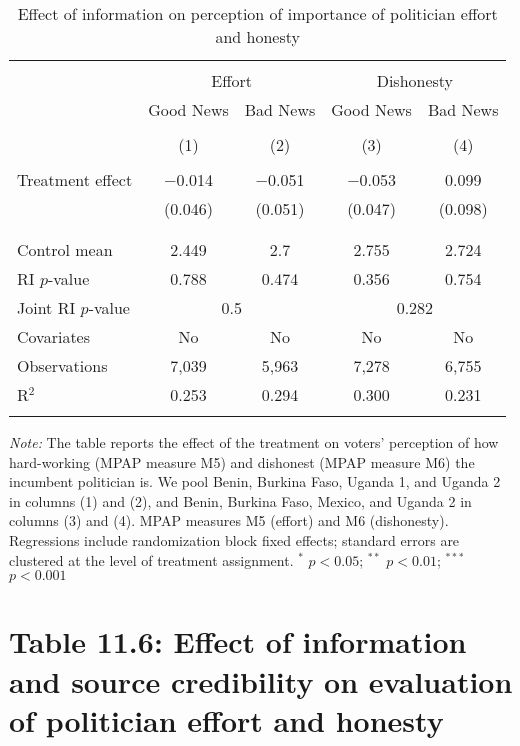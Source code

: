 \documentclass[]{article}
\begin{document}
\begin{table}[!htbp] \centering 
  \caption{Effect of information on perception of importance of politician effort and honesty} 
  \label{effort_honesty} 
\begin{tabular}{@{\extracolsep{1pt}}lcccc} 
\\[-1.8ex]\hline 
\hline \\[-1.8ex] 
 & \multicolumn{2}{c}{Effort}&\multicolumn{2}{c}{Dishonesty} \\ 
\cline{2-5} 
 & Good News & Bad News & Good News & Bad News \\ 
\\[-1.8ex] & (1) & (2) & (3) & (4)\\ 
\hline \\[-1.8ex] 
 Treatment effect & $-$0.014 & $-$0.051 & $-$0.053 & 0.099 \\ 
  & (0.046) & (0.051) & (0.047) & (0.098) \\ 
  & & & & \\ 
\hline \\[-1.8ex] 
Control mean & 2.449 & 2.7 & 2.755 & 2.724 \\ 
RI $p$-value & 0.788 & 0.474 & 0.356 & 0.754 \\ 
Joint RI $p$-value & \multicolumn{2}{c}{0.5} & \multicolumn{2}{c}{0.282} \\
Covariates & No & No & No & No \\ 
Observations & 7,039 & 5,963 & 7,278 & 6,755 \\ 
R$^{2}$ & 0.253 & 0.294 & 0.300 & 0.231 \\ 
\hline 
\hline \\[-1.8ex] 
\end{tabular} 
\begin{flushleft}\textit{Note:} The table reports the effect of the treatment on voters' perception of how hard-working (MPAP measure M5) and dishonest (MPAP measure M6) the incumbent politician is. We pool Benin, Burkina Faso, Uganda 1, and Uganda 2 in columns (1) and (2), and Benin, Burkina Faso, Mexico, and Uganda 2 in columns (3) and (4). MPAP measures M5 (effort) and M6 (dishonesty). Regressions include randomization block fixed effects; standard errors are clustered at the level of treatment assignment. $^{*}$ $p<0.05$; $^{**}$ $p<0.01$; $^{***}$ $p<0.001$ \end{flushleft}
\end{table}

\clearpage

\section{Table 11.6: Effect of information and source credibility on
evaluation of politician effort and
honesty}\label{table-11.6-effect-of-information-and-source-credibility-on-evaluation-of-politician-effort-and-honesty}
\end{document}
